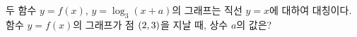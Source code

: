두 함수 $y=f(x)$, $y=\log_3 (x+a)$의 그래프는 직선 $y=x$에 대하여 대칭이다. 함수 $y=f(x)$의 그래프가 점 $(2{,}\mkern3mu\mathopen{}3)$을 지날 때, 상수 $a$의 값은?
